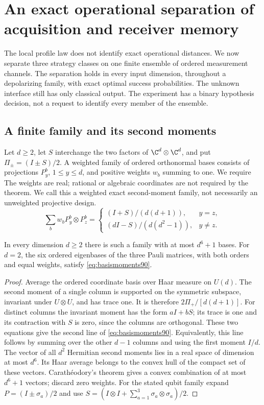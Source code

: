 \section{An exact operational separation of acquisition and receiver memory}
\label{sec:operationalmemory90}
The local profile law does not identify exact operational distances.
We now separate three strategy classes on one finite ensemble of ordered
measurement channels.  The separation holds in every input dimension,
throughout a depolarizing family, with exact optimal success probabilities.
The unknown interface still has only classical output.  The experiment
has a binary hypothesis decision, not a request to identify every member
of the ensemble.

\subsection{A finite family and its second moments}
Let $d\ge2$, let $S$ interchange the two factors of $\C^d\otimes\C^d$,
and put $\Pi_\pm=(I\pm S)/2$.  A weighted family of ordered orthonormal
bases consists of projections $P_y^b$, $1\le y\le d$, and positive
weights $w_b$ summing to one.  We require
The weights are real; rational or algebraic coordinates are not required
by the theorem.  We call this a weighted exact second-moment family,
not necessarily an unweighted projective design.
\begin{equation}\label{eq:basismoments90}
 \sum_b w_b P_y^b\otimes P_z^b=
 \begin{cases}
 (I+S)/(d(d+1)),&y=z,\\
 (dI-S)/(d(d^2-1)),&y\ne z.
 \end{cases}
\end{equation}
\begin{lemma}\label{lem:finitedesign90}
In every dimension $d\ge2$ there is such a family with at most $d^6+1$
bases.  For $d=2$, the six ordered eigenbases of the three Pauli matrices,
with both orders and equal weights, satisfy \eqref{eq:basismoments90}.
\end{lemma}
\begin{proof}
Average the ordered coordinate basis over Haar measure on $U(d)$.
The second moment of a single column is supported on the symmetric
subspace, invariant under $U\otimes U$, and has trace one.  It is
therefore $2\Pi_+/[d(d+1)]$.  For distinct columns the invariant moment
has the form $aI+bS$; its trace is one and its contraction with $S$ is
zero, since the columns are orthogonal.  These two equations give the
second line of \eqref{eq:basismoments90}.  Equivalently, this line follows
by summing over the other $d-1$ columns and using the first moment $I/d$.
The vector of all $d^2$ Hermitian second moments lies in a real space of
dimension at most $d^6$.  Its Haar average belongs to the convex hull
of the compact set of these vectors.  Carath\'eodory's theorem gives a
convex combination of at most $d^6+1$ vectors; discard zero weights.
For the stated qubit family expand $P=(I\pm\sigma_a)/2$ and use
$S=(I\otimes I+\sum_{a=1}^3\sigma_a\otimes\sigma_a)/2$.
\end{proof}
